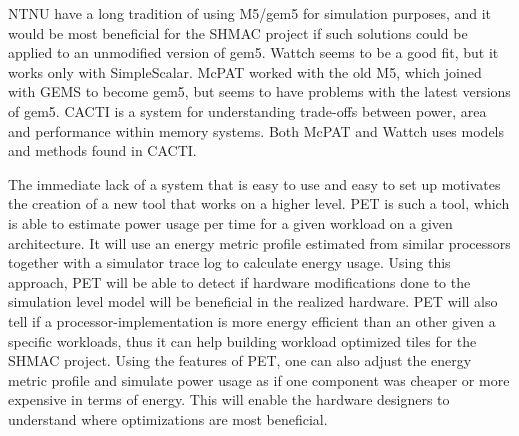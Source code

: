 NTNU have a long tradition of using M5/gem5 for simulation purposes, and it
would be most beneficial for the SHMAC project if such solutions could be
applied to an unmodified version of gem5. Wattch seems to be a good fit, but it
works only with SimpleScalar\cite{wattchanalysis}. McPAT worked with the old
M5\cite{m5mcpatparser}, which joined with GEMS to become gem5\cite{gem5hipeac},
but seems to have problems with the latest versions of
gem5\cite{mcpatgem5problems}. CACTI is a system for understanding trade-offs
between power, area and performance within memory
systems\cite{hpcacti,muralimanohar2010memory}. Both McPAT and Wattch uses
models and methods found in CACTI\cite{li2009mcpat}.

The immediate lack of a system that is easy to use and easy to set up motivates
the creation of a new tool that works on a higher level. PET is such a tool,
which is able to estimate power usage per time for a given workload on a given
architecture.  It will use an energy metric profile estimated from similar
processors together with a simulator trace log to calculate energy usage.
Using this approach, PET will be able to detect if hardware modifications done
to the simulation level model will be beneficial in the realized hardware. PET
will also tell if a processor-implementation is more energy efficient than an
other given a specific workloads, thus it can help building workload optimized tiles
for the SHMAC project\cite{shmacwebpage}. Using the features of PET, one can also
adjust the energy metric profile and simulate power usage as if one component was cheaper
or more expensive in terms of energy. This will enable the hardware designers to understand
where optimizations are most beneficial.




